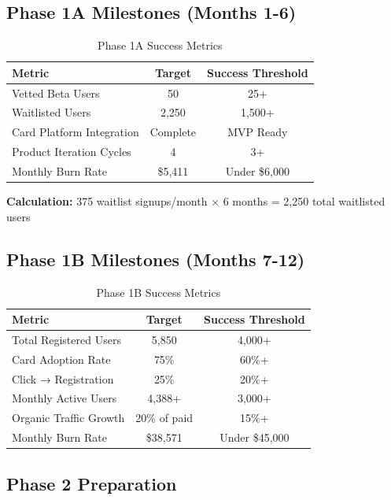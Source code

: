 \documentclass[11pt,letterpaper]{article}
\begin{document}
\subsection{Phase 1A Milestones (Months 1-6)}

\begin{table}[h]
\centering
\caption{Phase 1A Success Metrics}
\begin{tabular}{|l|c|c|}
\hline
\textbf{Metric} & \textbf{Target} & \textbf{Success Threshold} \\
\hline
Vetted Beta Users & 50 & 25+ \\
Waitlisted Users & 2,250 & 1,500+ \\
Card Platform Integration & Complete & MVP Ready \\
Product Iteration Cycles & 4 & 3+ \\
Monthly Burn Rate & \$5,411 & Under \$6,000 \\
\hline
\end{tabular}
\end{table}

\textbf{Calculation:} 375 waitlist signups/month × 6 months = 2,250 total waitlisted users

\subsection{Phase 1B Milestones (Months 7-12)}

\begin{table}[h]
\centering
\caption{Phase 1B Success Metrics}
\begin{tabular}{|l|c|c|}
\hline
\textbf{Metric} & \textbf{Target} & \textbf{Success Threshold} \\
\hline
Total Registered Users & 5,850 & 4,000+ \\
Card Adoption Rate & 75\% & 60\%+ \\
Click → Registration & 25\% & 20\%+ \\
Monthly Active Users & 4,388+ & 3,000+ \\
Organic Traffic Growth & 20\% of paid & 15\%+ \\
Monthly Burn Rate & \$38,571 & Under \$45,000 \\
\hline
\end{tabular}
\end{table}

\subsection{Phase 2 Preparation}
\end{document}
